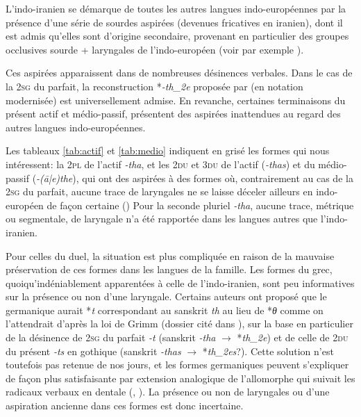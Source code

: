 \documentclass[oldfontcommands,oneside,a4paper,11pt]{article}
\newcommand{\ipa}[1]{{\phon\textit{#1}}} %
\begin{document}
L'indo-iranien se démarque de toutes les autres langues indo-européennes par la présence d'une série de sourdes aspirées (devenues fricatives en iranien), dont il est admis qu'elles sont d'origine secondaire, provenant en particulier des groupes occlusives sourde + laryngales de l'indo-européen (voir par exemple \citealt[112-4]{mayrhofer05fortsetzung}).

Ces aspirées apparaissent dans de nombreuses désinences verbales. Dans le cas de la \textsc{2sg} du parfait, la reconstruction *\ipa{-th_2e} proposée par \citet{kurylowicz1927schwa} (en notation modernisée) est universellement admise. En revanche, certaines terminaisons du présent actif et médio-passif, présentent des aspirées inattendues au regard des autres langues indo-européennes.

Les tableaux \ref{tab:actif} et \ref{tab:medio} indiquent en grisé les formes qui nous intéressent: la \textsc{2pl} de l'actif \ipa{-tha}, et les \textsc{2du} et \textsc{3du} de l'actif (\ipa{-thas}) et du médio-passif  (\ipa{-(ā|e)the}), qui ont des aspirées à des formes où, contrairement au cas de la \textsc{2sg} du parfait, aucune trace de laryngales ne se laisse déceler ailleurs en indo-européen de façon certaine (\citealt[309-311]{burrow55skt})
Pour la seconde pluriel \ipa{-tha}, aucune trace, métrique ou segmentale, de laryngale n'a été rapportée dans les langues autres que l'indo-iranien. 

Pour celles du duel, la situation est plus compliquée en raison de la mauvaise préservation de ces formes dans les langues de la famille. Les formes du grec, quoiqu'indéniablement apparentées à celle de l'indo-iranien, sont peu informatives sur la présence ou non d'une laryngale. Certains auteurs ont proposé que le germanique aurait *\ipa{t} correspondant au sanskrit \ipa{th} au lieu de *\ipa{θ} comme on l'attendrait d'après la loi de Grimm (dossier cité dans \citealt[113]{mayrhofer05fortsetzung}), sur la base en particulier de la désinence de \textsc{2sg} du parfait \ipa{-t} (sanskrit \ipa{-tha} $\rightarrow$ *\ipa{th_2e}) et de celle de \textsc{2du} du présent  \ipa{-ts} en gothique (sanskrit \ipa{-thas} $\rightarrow$ *\ipa{th_2es}?). Cette solution n'est toutefois pas retenue de nos jours, et les formes germaniques peuvent s'expliquer de façon plus satisfaisante par extension analogique de l'allomorphe qui suivait les radicaux verbaux en dentale (\citealt[84]{hill03zusammenstoss}, \citealt[192]{ringe06PIE}). La présence ou non de laryngales ou d'une aspiration ancienne dans ces formes est donc incertaine.
\end{document}
